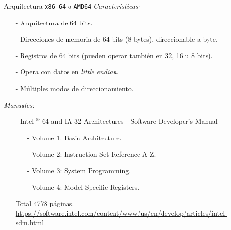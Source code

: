 \documentclass[aspectratio=169]{beamer}
\begin{document}
\begin{frame}[fragile]{Arquitectura \texttt{x86-64} o \texttt{AMD64}}
    \textit{Características:}\\
    \begin{itemize}
    \item[-] Arquitectura de 64 bits.
    \item[-] Direcciones de memoria de 64 bits (8 bytes), direccionable a byte.
    \item[-] Registros de 64 bits (pueden operar también en 32, 16 u 8 bits).
    \item[-] Opera con datos en \textit{little endian}.
    \item[-] Múltiples modos de direccionamiento.
    \end{itemize}
    \pause
    \textit{Manuales:}\\
    \begin{itemize}
    \item[-] Intel $^{\circledR}$ 64 and IA-32 Architectures - Software Developer’s Manual\\
    \begin{itemize}
    \item[-] Volume 1: Basic Architecture.
    \item[-] Volume 2: Instruction Set Reference A-Z.
    \item[-] Volume 3: System Programming.
    \item[-] Volume 4: Model-Specific Registers.
    \end{itemize}
    Total 4778 páginas.\\
    { \scriptsize \url{https://software.intel.com/content/www/us/en/develop/articles/intel-sdm.html} }\\
    \end{itemize}
\end{frame}
\end{document}
